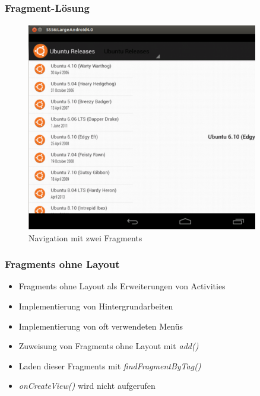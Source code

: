 \begin{frame}[label=fragment_layout]
   \frametitle{Fragment-Lösung}
	\begin{figure}[h!]
	  \centering
	  \includegraphics[width=0.9\textwidth]{pictures/ubuntu_list_large.ps}
	  \caption{
		  Navigation mit zwei Fragments
	  }
	  \label{fig:ubuntu_fragment_list}
	\end{figure}
\end{frame}

\begin{frame}[label=fragments_without_layout]
   \frametitle{Fragments ohne Layout}
   \begin{itemize}
      \item Fragments ohne Layout als Erweiterungen von Activities
      \item Implementierung von Hintergrundarbeiten
      \item Implementierung von oft verwendeten Menüs
      \item Zuweisung von Fragments ohne Layout mit \emph{add()}
      \item Laden dieser Fragments mit \emph{findFragmentByTag()}
      \item \emph{onCreateView()} wird nicht aufgerufen
   \end{itemize}
\end{frame}

